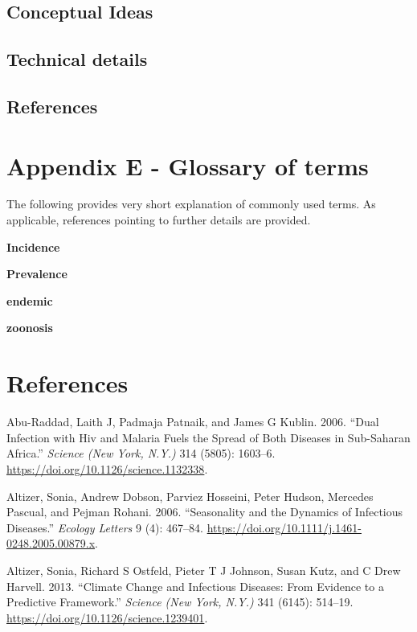 \documentclass[
]{book}
\begin{document}
\hypertarget{conceptual-ideas}{%
\section{Conceptual Ideas}\label{conceptual-ideas}}

\hypertarget{technical-details}{%
\section{Technical details}\label{technical-details}}

\hypertarget{references-22}{%
\section{References}\label{references-22}}

\hypertarget{glossary}{%
\chapter{Appendix E - Glossary of terms}\label{glossary}}

The following provides very short explanation of commonly used terms. As applicable, references pointing to further details are provided.

\textbf{Incidence}

\textbf{Prevalence}

\textbf{endemic}

\textbf{zoonosis}

\hypertarget{references}{%
\chapter{References}\label{references}}

\hypertarget{refs}{}
\leavevmode\hypertarget{ref-abu-raddad06}{}%
Abu-Raddad, Laith J, Padmaja Patnaik, and James G Kublin. 2006. ``Dual Infection with Hiv and Malaria Fuels the Spread of Both Diseases in Sub-Saharan Africa.'' \emph{Science (New York, N.Y.)} 314 (5805): 1603--6. \url{https://doi.org/10.1126/science.1132338}.

\leavevmode\hypertarget{ref-altizer06}{}%
Altizer, Sonia, Andrew Dobson, Parviez Hosseini, Peter Hudson, Mercedes Pascual, and Pejman Rohani. 2006. ``Seasonality and the Dynamics of Infectious Diseases.'' \emph{Ecology Letters} 9 (4): 467--84. \url{https://doi.org/10.1111/j.1461-0248.2005.00879.x}.

\leavevmode\hypertarget{ref-altizer13}{}%
Altizer, Sonia, Richard S Ostfeld, Pieter T J Johnson, Susan Kutz, and C Drew Harvell. 2013. ``Climate Change and Infectious Diseases: From Evidence to a Predictive Framework.'' \emph{Science (New York, N.Y.)} 341 (6145): 514--19. \url{https://doi.org/10.1126/science.1239401}.
\end{document}
